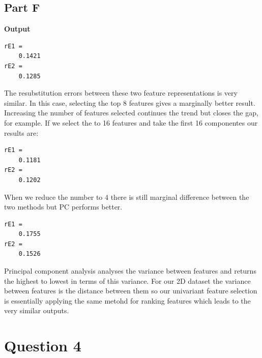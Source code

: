 \documentclass{article}
\begin{document}
\pagebreak
\subsection*{Part F}

\textbf{Output}
\begin{lstlisting}
rE1 =
	0.1421
rE2 =
	0.1285
\end{lstlisting}

The resubstitution errors between these two feature representations is very similar. In this case, selecting the top 8 features gives a marginally better result. Increasing the number of features selected continues the trend but closes the gap, for example. If we select the to 16 features and take the first 16 componentes our results are:
\begin{lstlisting}
rE1 =
	0.1181
rE2 =
	0.1202
\end{lstlisting}

When we reduce the number to 4 there is still marginal difference between the two methods but PC performs better.
\begin{lstlisting}
rE1 =
	0.1755
rE2 =
	0.1526
\end{lstlisting}

Principal component analysis analyses the variance between features and returns the highest to lowest in terms of this variance. For our 2D dataset the variance between features is the distance between them so our univariant feature selection is essentially applying the same metohd for ranking features which leads to the very similar outputs.

\section*{Question 4}


\end{document}
